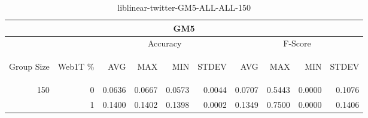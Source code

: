 \begin{center}
\begin{table}[htbp]
\begin{tabular}{ | r | r | r | r | r | r | r | r | r | r |}
\hline
\multicolumn{10}{|c|}{GM5}\\
\hline
 & & \multicolumn{4}{|c|}{Accuracy} & \multicolumn{4}{|c|}{F-Score}\\ \cline{3-10}
\begin{sideways}Group Size\end{sideways} & \begin{sideways}Web1T \%\end{sideways} & \begin{sideways}AVG\end{sideways} & \begin{sideways}MAX\end{sideways} & \begin{sideways}MIN\end{sideways} & \begin{sideways}STDEV\end{sideways} & \begin{sideways}AVG\end{sideways} & \begin{sideways}MAX\end{sideways} & \begin{sideways}MIN\end{sideways} & \begin{sideways}STDEV\end{sideways}\\
\hline
\multirow{2}{*}{150}
 & 0 & 0.0636 & 0.0667 & 0.0573 & 0.0044 & 0.0707 & 0.5443 & 0.0000 & 0.1076\\ \cline{2-10}
 & 1 & 0.1400 & 0.1402 & 0.1398 & 0.0002 & 0.1349 & 0.7500 & 0.0000 & 0.1406\\ \cline{2-10}
\hline
\end{tabular}
\caption{liblinear-twitter-GM5-ALL-ALL-150}
\end{table}
\end{center}

